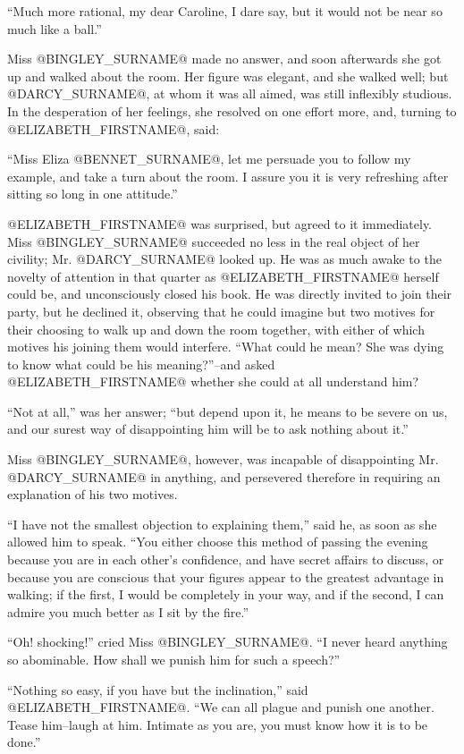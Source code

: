 ``Much more rational, my dear Caroline, I dare say, but it would not be
near so much like a ball.''

Miss @BINGLEY_SURNAME@ made no answer, and soon afterwards she got up and walked
about the room. Her figure was elegant, and she walked well; but
@DARCY_SURNAME@, at whom it was all aimed, was still inflexibly studious. In
the desperation of her feelings, she resolved on one effort more, and,
turning to @ELIZABETH_FIRSTNAME@, said:

``Miss Eliza @BENNET_SURNAME@, let me persuade you to follow my example, and take a
turn about the room. I assure you it is very refreshing after sitting so
long in one attitude.''

@ELIZABETH_FIRSTNAME@ was surprised, but agreed to it immediately. Miss @BINGLEY_SURNAME@
succeeded no less in the real object of her civility; Mr. @DARCY_SURNAME@ looked
up. He was as much awake to the novelty of attention in that quarter as
@ELIZABETH_FIRSTNAME@ herself could be, and unconsciously closed his book. He was
directly invited to join their party, but he declined it, observing that
he could imagine but two motives for their choosing to walk up and down
the room together, with either of which motives his joining them would
interfere. ``What could he mean? She was dying to know what could be his
meaning?''--and asked @ELIZABETH_FIRSTNAME@ whether she could at all understand him?

``Not at all,'' was her answer; ``but depend upon it, he means to be severe
on us, and our surest way of disappointing him will be to ask nothing
about it.''

Miss @BINGLEY_SURNAME@, however, was incapable of disappointing Mr. @DARCY_SURNAME@ in
anything, and persevered therefore in requiring an explanation of his
two motives.

``I have not the smallest objection to explaining them,'' said he, as soon
as she allowed him to speak. ``You either choose this method of passing
the evening because you are in each other's confidence, and have secret
affairs to discuss, or because you are conscious that your figures
appear to the greatest advantage in walking; if the first, I would be
completely in your way, and if the second, I can admire you much better
as I sit by the fire.''

``Oh! shocking!'' cried Miss @BINGLEY_SURNAME@. ``I never heard anything so
abominable. How shall we punish him for such a speech?''

``Nothing so easy, if you have but the inclination,'' said @ELIZABETH_FIRSTNAME@. ``We
can all plague and punish one another. Tease him--laugh at him. Intimate
as you are, you must know how it is to be done.''

